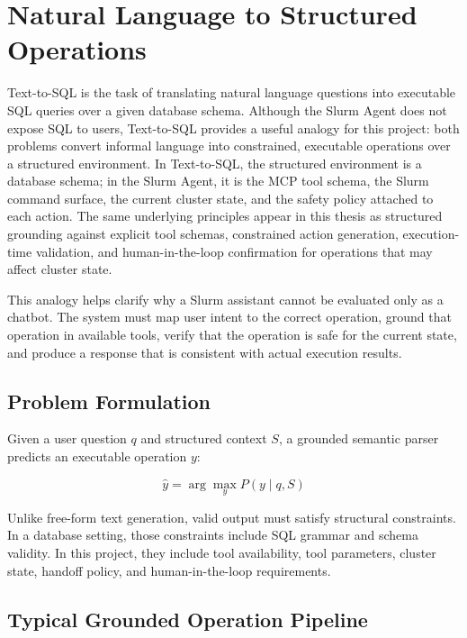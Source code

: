 \section{Natural Language to Structured Operations}
\label{sec:text-to-sql}

Text-to-SQL is the task of translating natural language questions into executable SQL queries over a given database schema. Although the Slurm Agent does not expose SQL to users, Text-to-SQL provides a useful analogy for this project: both problems convert informal language into constrained, executable operations over a structured environment. In Text-to-SQL, the structured environment is a database schema; in the Slurm Agent, it is the MCP tool schema, the Slurm command surface, the current cluster state, and the safety policy attached to each action. The same underlying principles appear in this thesis as structured grounding against explicit tool schemas, constrained action generation, execution-time validation, and human-in-the-loop confirmation for operations that may affect cluster state.

This analogy helps clarify why a Slurm assistant cannot be evaluated only as a chatbot. The system must map user intent to the correct operation, ground that operation in available tools, verify that the operation is safe for the current state, and produce a response that is consistent with actual execution results.

\subsection{Problem Formulation}

Given a user question $q$ and structured context $S$, a grounded semantic parser predicts an executable operation $y$:

\begin{equation}
\hat{y} = \arg\max_y P(y \mid q, S)
\end{equation}

Unlike free-form text generation, valid output must satisfy structural constraints. In a database setting, those constraints include SQL grammar and schema validity. In this project, they include tool availability, tool parameters, cluster state, handoff policy, and human-in-the-loop requirements.

\subsection{Typical Grounded Operation Pipeline}

